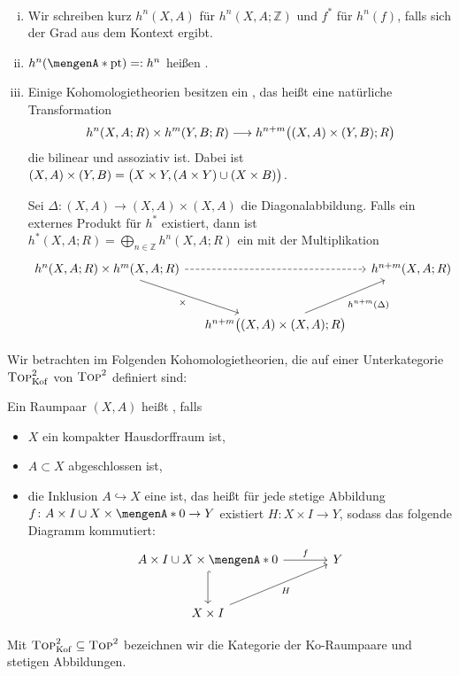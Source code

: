 \begin{bemerkung}
\mbox{ }
\begin{enumerate}[(i)]
	\item Wir schreiben kurz $h^n(X,A)$ für $h^n(X,A;\mathds{Z})$ und $f^*$ für $h^n(f)$, falls sich der Grad aus dem Kontext ergibt. 
	\item $h^n(\set{\mathrm{pt}}) =: h^n$ heißen .
	\item Einige Kohomologietheorien besitzen ein , das heißt eine natürliche Transformation
	\[
		h^n(X,A;R) \times h^m(Y,B;R) \longrightarrow h^{n+m} \enbrace[\big]{(X,A) \times (Y,B);R} 
	\]
	die bilinear und assoziativ ist. 
	Dabei ist $(X,A) \times (Y,B) = \enbrace[\big]{X \times Y, (A \times Y) \cup (X \times B)}$.
	
	Sei $\Delta \colon (X,A) \to (X,A) \times (X,A)$ die Diagonalabbildung.
	Falls ein externes Produkt für $h^*$ existiert, dann ist $h^*(X,A;R) = \bigoplus_{n \in \mathds{Z}} h^n(X,A;R)$ ein  mit der Multiplikation 
	\[
		\begin{tikzcd}[row sep=large, column sep=small]
			h^n(X,A;R) \times h^m(X,A;R) \arrow[dashed]{rr} \arrow["\times"']{dr} & & h^{n+m}(X,A;R) \\
			& h^{n+m} \enbrace[\big]{(X,A) \times (X,A);R} \arrow["h^{n+m}(\Delta)"']{ur} &
		\end{tikzcd}
	\]
\end{enumerate}
\end{bemerkung}

\noindent Wir betrachten im Folgenden Kohomologietheorien, die auf einer Unterkategorie $\TOP^2_{\mathrm{Kof}}$ von $\TOP^2$ definiert sind:


\begin{definition}[{name=[Ko-Raumpaar und Kofaserung]},label=def_koraumpaar]
Ein Raumpaar $(X,A)$ heißt , falls
\begin{itemize}
	\item $X$ ein kompakter Hausdorffraum ist,
	\item $A \subset X$ abgeschlossen ist,
	\item die Inklusion $A \hookrightarrow X$ eine  ist, das heißt für jede stetige Abbildung 
	$f \colon A \times I \cup X \times \set{0} \to Y$ existiert 
	$H \colon X \times I \to Y$, sodass das folgende Diagramm kommutiert:
	\[
		\begin{tikzcd}[sep=large]
			A \times I \cup X \times \set{0} \rar["f"] \dar[hook]& Y \\
			X \times I \urar["H"'] & 
		\end{tikzcd}
	\] 
\end{itemize}
Mit $\TOP^2_{\mathrm{Kof}} \subseteq \TOP^2$ bezeichnen wir die Kategorie der Ko-Raumpaare und stetigen Abbildungen.	
\end{definition}

